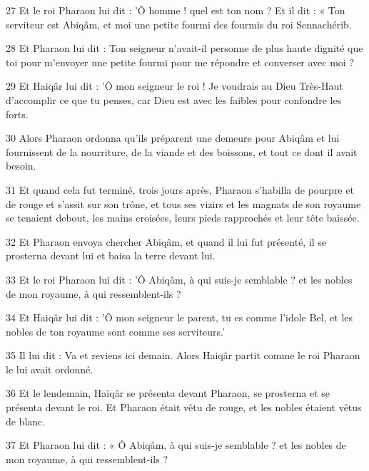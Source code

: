 \par 27 Et le roi Pharaon lui dit : 'Ô homme ! quel est ton nom ? Et il dit : « Ton serviteur est Abiqâm, et moi une petite fourmi des fourmis du roi Sennachérib.

\par 28 Et Pharaon lui dit : Ton seigneur n'avait-il personne de plus haute dignité que toi pour m'envoyer une petite fourmi pour me répondre et converser avec moi ?

\par 29 Et Haiqâr lui dit : 'Ô mon seigneur le roi ! Je voudrais au Dieu Très-Haut d'accomplir ce que tu penses, car Dieu est avec les faibles pour confondre les forts.

\par 30 Alors Pharaon ordonna qu'ils préparent une demeure pour Abiqâm et lui fournissent de la nourriture, de la viande et des boissons, et tout ce dont il avait besoin.

\par 31 Et quand cela fut terminé, trois jours après, Pharaon s'habilla de pourpre et de rouge et s'assit sur son trône, et tous ses vizirs et les magnats de son royaume se tenaient debout, les mains croisées, leurs pieds rapprochés et leur tête baissée.

\par 32 Et Pharaon envoya chercher Abiqâm, et quand il lui fut présenté, il se prosterna devant lui et baisa la terre devant lui.

\par 33 Et le roi Pharaon lui dit : 'Ô Abiqâm, à qui suis-je semblable ? et les nobles de mon royaume, à qui ressemblent-ils ?

\par 34 Et Haiqâr lui dit : 'Ô mon seigneur le parent, tu es comme l'idole Bel, et les nobles de ton royaume sont comme ses serviteurs.'

\par 35 Il lui dit : Va et reviens ici demain. Alors Haiqâr partit comme le roi Pharaon le lui avait ordonné.

\par 36 Et le lendemain, Haïqâr se présenta devant Pharaon, se prosterna et se présenta devant le roi. Et Pharaon était vêtu de rouge, et les nobles étaient vêtus de blanc.

\par 37 Et Pharaon lui dit : « Ô Abiqâm, à qui suis-je semblable ? et les nobles de mon royaume, à qui ressemblent-ils ?

